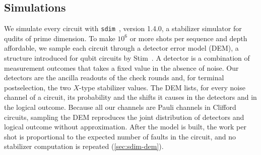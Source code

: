 \subsection{Simulations}
\label{sub:sim_framework}

We simulate every circuit with \texttt{sdim}~\cite{sdim}, version 1.4.0, a stabilizer simulator for qudits of prime dimension. To make $10^6$ or more shots per sequence and depth affordable, we sample each circuit through a detector error model (DEM), a structure introduced for qubit circuits by Stim~\cite{Gidney2021Stim}. A detector is a combination of measurement outcomes that takes a fixed value in the absence of noise. Our detectors are the ancilla readouts of the check rounds and, for terminal postselection, the two $X$-type stabilizer values. The DEM lists, for every noise channel of a circuit, its probability and the shifts it causes in the detectors and in the logical outcome. Because all our channels are Pauli channels in Clifford circuits, sampling the DEM reproduces the joint distribution of detectors and logical outcome without approximation. After the model is built, the work per shot is proportional to the expected number of faults in the circuit, and no stabilizer computation is repeated (\autoref{sec:sdim-dem}).

